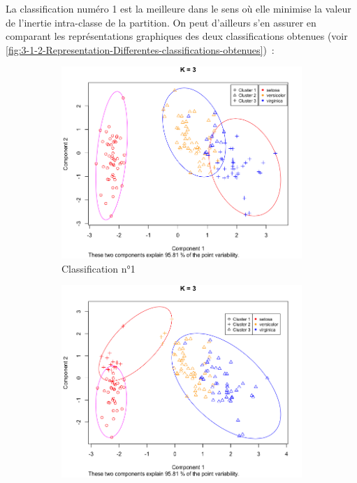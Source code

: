 \documentclass[a4paper,10pt]{report}
\begin{document}
La classification numéro 1 est la meilleure dans le sens où elle minimise la valeur de l'inertie intra-classe de la partition. On peut d'ailleurs s'en assurer en comparant les représentations graphiques des deux classifications obtenues (voir \autoref{fig:3-1-2-Representation-Differentes-classifications-obtenues})~:



\begin{figure}[H]
	\centering
	\captionsetup{justification=centering, margin=3cm}
	\begin{subfigure}[b]{0.5\linewidth}
		\centering
		\captionsetup{justification=centering}
		\includegraphics[width=1\linewidth]{img/3-1-2-iris-kmeans-3-min-inertie}
		\caption{\small Classification n°1}
		\label{fig:3-1-2-iris-kmeans-3-min-inertie}
	\end{subfigure}%
	\begin{subfigure}[b]{0.5\linewidth}
		\centering
		\captionsetup{justification=centering}
		\includegraphics[width=1\linewidth]{img/3-1-2-iris-kmeans-3-max-inertie}

\end{subfigure}
\end{figure}
\end{document}
